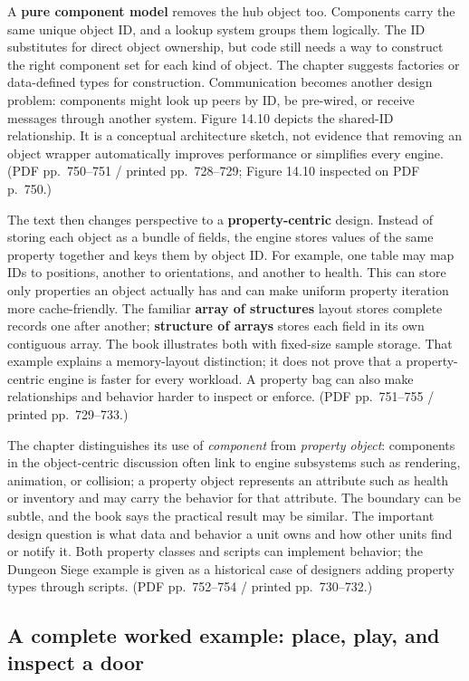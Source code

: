 A \textbf{pure component model} removes the hub object too. Components carry the same unique object ID, and a lookup system groups them logically. The ID substitutes for direct object ownership, but code still needs a way to construct the right component set for each kind of object. The chapter suggests factories or data-defined types for construction. Communication becomes another design problem: components might look up peers by ID, be pre-wired, or receive messages through another system. Figure 14.10 depicts the shared-ID relationship. It is a conceptual architecture sketch, not evidence that removing an object wrapper automatically improves performance or simplifies every engine. (PDF pp.~750--751 / printed pp.~728--729; Figure 14.10 inspected on PDF p.~750.)

The text then changes perspective to a \textbf{property-centric} design. Instead of storing each object as a bundle of fields, the engine stores values of the same property together and keys them by object ID. For example, one table may map IDs to positions, another to orientations, and another to health. This can store only properties an object actually has and can make uniform property iteration more cache-friendly. The familiar \textbf{array of structures} layout stores complete records one after another; \textbf{structure of arrays} stores each field in its own contiguous array. The book illustrates both with fixed-size sample storage. That example explains a memory-layout distinction; it does not prove that a property-centric engine is faster for every workload. A property bag can also make relationships and behavior harder to inspect or enforce. (PDF pp.~751--755 / printed pp.~729--733.)

The chapter distinguishes its use of \emph{component} from \emph{property object}: components in the object-centric discussion often link to engine subsystems such as rendering, animation, or collision; a property object represents an attribute such as health or inventory and may carry the behavior for that attribute. The boundary can be subtle, and the book says the practical result may be similar. The important design question is what data and behavior a unit owns and how other units find or notify it. Both property classes and scripts can implement behavior; the Dungeon Siege example is given as a historical case of designers adding property types through scripts. (PDF pp.~752--754 / printed pp.~730--732.)

\subsection{A complete worked example: place, play, and inspect a door}\label{06-engine-ii-ch041-a-complete-worked-example-place-play-and-inspect-a-door}


